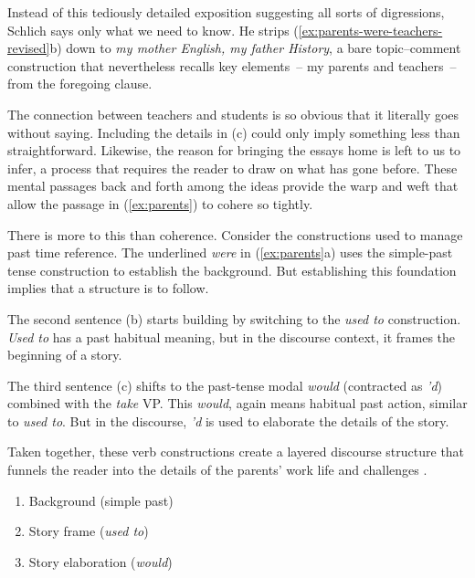 Instead of this tediously detailed exposition suggesting all sorts of digressions, Schlich says only what we need to know. He strips (\ref{ex:parents-were-teachers-revised}b) down to \textit{my mother English, my father History}, a bare topic--comment construction that nevertheless recalls key elements~-- my parents and teachers~-- from the foregoing clause.

The connection between teachers and students is so obvious that it literally goes without saying. Including the details in (c) could only imply something less than straightforward. Likewise, the reason for bringing the essays home is left to us to infer, a process that requires the reader to draw on what has gone before. These mental passages back and forth among the ideas provide the warp and weft that allow the passage in (\ref{ex:parents}) to cohere so tightly.

\bigskip

There is more to this than coherence. Consider the constructions used to manage past time reference. The underlined \textit{were} in (\ref{ex:parents}a) uses the simple-past tense construction to establish the background. But establishing this foundation implies that a structure is to follow.

The second sentence (b) starts building by switching to the \textit{used to} construction. \textit{Used to} has a past habitual meaning, but in the discourse context, it frames the beginning of a story.

The third sentence (c) shifts to the past-tense modal \textit{would} (contracted as \textit{'d}) combined with the \textit{take} VP. This \textit{would}, again means habitual past action, similar to \textit{used to}. But in the discourse, \textit{'d} is used to elaborate the details of the story.

Taken together, these verb constructions create a layered discourse structure that funnels the reader into the details of the parents' work life and challenges \citep{Suh1992}.

\begin{enumerate}[noitemsep]
    \item Background (simple past)
    \item Story frame (\textit{used to})
    \item Story elaboration (\textit{would})
\end{enumerate}

